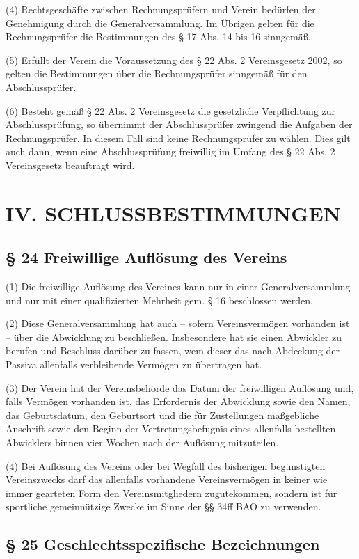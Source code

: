 \documentclass[11pt,a4paper]{article}
\begin{document}
(4)
Rechtsgeschäfte zwischen Rechnungsprüfern und Verein bedürfen der Genehmigung durch die Generalversammlung.
Im Übrigen gelten für die Rechnungsprüfer die Bestimmungen des § 17 Abs. 14 bis 16 sinngemäß.

(5)
Erfüllt der Verein die Voraussetzung des § 22 Abs. 2 Vereinsgesetz 2002, so gelten die Bestimmungen über die Rechnungsprüfer sinngemäß für den Abschlussprüfer.

(6)
Besteht gemäß § 22 Abs. 2 Vereinsgesetz die gesetzliche Verpflichtung zur Abschlussprüfung, so übernimmt der Abschlussprüfer zwingend die Aufgaben der Rechnungsprüfer.
In diesem Fall sind keine Rechnungsprüfer zu wählen.
Dies gilt auch dann, wenn eine Abschlussprüfung freiwillig im Umfang des § 22 Abs. 2 Vereinsgesetz beauftragt wird.

\section{IV. SCHLUSSBESTIMMUNGEN}

\subsection{§ 24
Freiwillige Auflösung des Vereins}

(1)
Die freiwillige Auflösung des Vereines kann nur in einer Generalversammlung und nur mit einer qualifizierten Mehrheit gem. § 16 beschlossen werden.

(2)
Diese Generalversammlung hat auch – sofern Vereinsvermögen vorhanden ist – über die Abwicklung zu beschließen.
Insbesondere hat sie einen Abwickler zu berufen und Beschluss darüber zu fassen, wem dieser das nach Abdeckung der Passiva allenfalls verbleibende Vermögen zu übertragen hat.

(3)
Der Verein hat der Vereinsbehörde das Datum der freiwilligen Auflösung und, falls Vermögen vorhanden ist, das Erfordernis der Abwicklung sowie den Namen, das Geburtsdatum, den Geburtsort und die für Zustellungen maßgebliche Anschrift sowie den Beginn der Vertretungsbefugnis eines allenfalls bestellten Abwicklers binnen vier Wochen nach der Auflösung mitzuteilen.

(4)
Bei Auflösung des Vereins oder bei Wegfall des bisherigen begünstigten Vereinszwecks darf das allenfalls vorhandene Vereinsvermögen in keiner wie immer gearteten Form den Vereinsmitgliedern zugutekommen, sondern ist für sportliche gemeinnützige Zwecke im Sinne der §§ 34ff BAO zu verwenden.

\subsection{§ 25
Geschlechtsspezifische Bezeichnungen}
\end{document}
